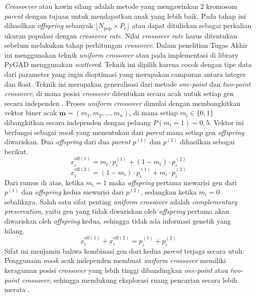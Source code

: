     \textit{Crossoever} atau kawin silang adalah metode yang mengawinkan 2 kromosom \textit{parent} dengan tujuan untuk mendapatkan anak yang lebih baik. Pada tahap ini dihasilkan \textit{offspring} sebanyak 
    $\lfloor N_{\text{pop}} \times P_c \rfloor$ atau dapat dituliskan 
    sebagai perkalian ukuran populasi dengan \textit{crossover rate}. Nilai \textit{crossover rate} harus ditentukan sebelum melakukan tahap perhitungan \textit{crossover}\cite{mahmudy2013algoritma}. Dalam penelitian Tugas Akhir ini menggunakan teknik \textit{uniform crossover} atau pada implementasi di library PyGAD menggunakan \textit{scattered}. Teknik ini dipilih karena cocok dengan tipe data dari parameter yang ingin dioptimasi yang merupakan campuran antara integer dan float. Teknik ini merupakan generalisasi dari metode \textit{one-point} dan \textit{two-point crossover}, di mana posisi \textit{crossover} ditentukan secara acak untuk setiap gen secara independen \cite{Deep2007}.
    Proses \textit{uniform crossover} dimulai dengan membangkitkan vektor biner acak $\mathbf{m} = (m_1, m_2, \ldots, m_n)$, di mana setiap $m_i \in \{0, 1\}$ dibangkitkan secara independen dengan peluang $P(m_i = 1) = 0{,}5$. Vektor ini berfungsi sebagai \textit{mask} yang menentukan dari \textit{parent} mana setiap gen \textit{offspring} diwariskan. Dua \textit{offspring} dari dua \textit{parent} $p^{(1)}$ dan $p^{(2)}$ dihasilkan sebagai berikut.
        \begin{equation}
            x_i^{\text{off}(1)} = m_i \cdot p_i^{(1)} + (1 - m_i) \cdot p_i^{(2)}
        \end{equation}
        \begin{equation}
            x_i^{\text{off}(2)} = (1 - m_i) \cdot p_i^{(1)} + m_i \cdot p_i^{(2)}
        \end{equation}
    \noindent Dari rumus di atas, ketika $m_i = 1$ maka \textit{offspring} pertama mewarisi gen dari $p^{(1)}$ dan \textit{offspring} kedua mewarisi dari $p^{(2)}$, sedangkan ketika $m_i = 0$ sebaliknya. Salah satu sifat penting \textit{uniform crossover} adalah \textit{complementary preservation}, yaitu gen yang tidak diwariskan oleh \textit{offspring} pertama akan diwariskan oleh \textit{offspring} kedua, sehingga tidak ada informasi genetik yang hilang.
        \begin{equation}
            x_i^{\text{off}(1)} + x_i^{\text{off}(2)} = p_i^{(1)} + p_i^{(2)}
        \end{equation}
    \noindent Sifat ini menjamin bahwa kombinasi gen dari kedua \textit{parent} terjaga secara utuh. Penggunaan \textit{mask} acak independen membuat \textit{uniform crossover} memiliki keragaman posisi \textit{crossover} yang lebih tinggi dibandingkan \textit{one-point} atau \textit{two-point crossover}, sehingga mendukung eksplorasi ruang pencarian secara lebih merata \cite{Deep2007, Mitchell1998}.
        
